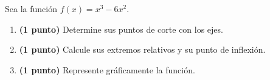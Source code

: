 
Sea la función $f(x)=x^3-6x^2$.
\begin{enumerate}[label=\alph*)]
\item \textbf{(1 punto)} Determine sus puntos de corte con los ejes.
\item \textbf{(1 punto)} Calcule sus extremos relativos y su punto de inflexión.
\item \textbf{(1 punto)} Represente gráficamente la función.
\end{enumerate}

